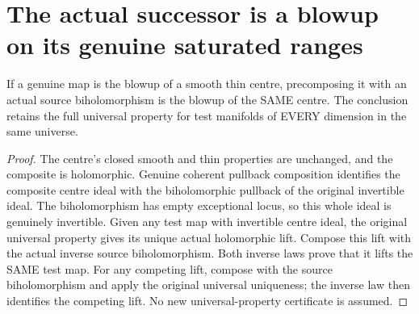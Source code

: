 \section{The actual successor is a blowup on its genuine saturated ranges}

\begin{theorem}
\label{hir:sharp-actual-blowup-source-biholomorphism}
\leanok
If a genuine map is the blowup of a smooth thin centre, precomposing it
with an actual source biholomorphism is the blowup of the SAME centre.
The conclusion retains the full universal property for test manifolds
of EVERY dimension in the same universe.
\end{theorem}
\begin{proof}
The centre's closed smooth and thin properties are unchanged, and the
composite is holomorphic. Genuine coherent pullback composition identifies
the composite centre ideal with the biholomorphic pullback of the original
invertible ideal. The biholomorphism has empty exceptional locus, so this
whole ideal is genuinely invertible. Given any test map with invertible
centre ideal, the original universal property gives its unique actual
holomorphic lift. Compose this lift with the actual inverse source
biholomorphism. Both inverse laws prove that it lifts the SAME test map.
For any competing lift, compose with the source biholomorphism and apply
the original universal uniqueness; the inverse law then identifies the
competing lift. No new universal-property certificate is assumed.
\end{proof}

